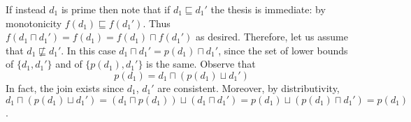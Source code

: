 \documentclass[conference]{IEEEtran}
\renewenvironment{proof}{\begin{IEEEproof}}{\end{IEEEproof}}
\newcommand{\pred}[1]{\ensuremath{\mathit{p}({#1})}}
\begin{document}
\begin{proof}
  
  If instead $d_1$ is prime then note that if $d_1 \sqsubseteq d_1'$
  the thesis is immediate: by monotonicity
  $f(d_1) \sqsubseteq f(d_1')$. Thus
  $f(d_1 \sqcap d_1') = f(d_1) = f(d_1)\sqcap f(d_1')$ as
  desired. Therefore, let us assume that $d_1 \not\sqsubseteq
  d_1'$.
  In this case $d_1 \sqcap d_1' = \pred{d_1} \sqcap d_1'$, since the set
  of lower bounds of $\{ d_1, d_1'\}$ and of $\{ \pred{d_1}, d_1' \}$ is
  the same. Observe that
  \begin{equation}
    \label{eq:pad1}
    \pred{d_1} = d_1 \sqcap (\pred{d_1} \sqcup d_1')
  \end{equation}
  In fact, the join exists since $d_1$, $d_1'$ are consistent. Moreover, by distributivity,
  $d_1 \sqcap (\pred{d_1} \sqcup d_1') = (d_1 \sqcap \pred{d_1})
  \sqcup (d_1 \sqcap d_1') = \pred{d_1} \sqcup (\pred{d_1} \sqcap
  d_1') = \pred{d_1}$.
  

\end{proof}
\end{document}
